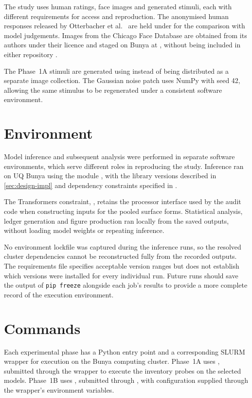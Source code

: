 The study uses human ratings, face images and generated stimuli, each with
different requirements for access and reproduction. The anonymised human
responses released by Otterbacher et al.\ \cite{otterbacher2018sigir} are held
under  for the comparison with model judgements. Images
from the Chicago Face Database are obtained from its authors under their
licence and staged on Bunya at , without
being included in either repository \cite{ma2015cfd}.

The Phase~1A stimuli are generated using 
instead of being distributed as a separate image collection. The Gaussian
noise patch uses NumPy with seed 42, allowing the same stimulus to be
regenerated under a consistent software environment.

\section{Environment}\label{app:repro-env}

Model inference and subsequent analysis were performed in separate software
environments, which serve different roles in reproducing the study. Inference
ran on UQ Bunya using the module , with
the library versions described in \cref{sec:design-impl} and dependency
constraints specified in .

The Transformers constraint, , retains the
processor interface used by the audit code when constructing inputs for the
pooled surface forms. Statistical analysis, ledger generation and figure
production ran locally from the saved outputs, without loading model weights
or repeating inference.

No environment lockfile was captured during the inference runs, so the
resolved cluster dependencies cannot be reconstructed fully from the recorded
outputs. The requirements file specifies acceptable version ranges but does
not establish which versions were installed for every individual run.
Future runs should save the output of \texttt{pip freeze} alongside each
job's results to provide a more complete record of the execution environment.

\section{Commands}\label{app:repro-cmd}

Each experimental phase has a Python entry point and a corresponding SLURM
wrapper for execution on the Bunya computing cluster. Phase~1A uses
, submitted through the wrapper
 to execute the inventory probes on the
selected models. Phase~1B uses , submitted through
, with configuration supplied through the
wrapper's environment variables.

